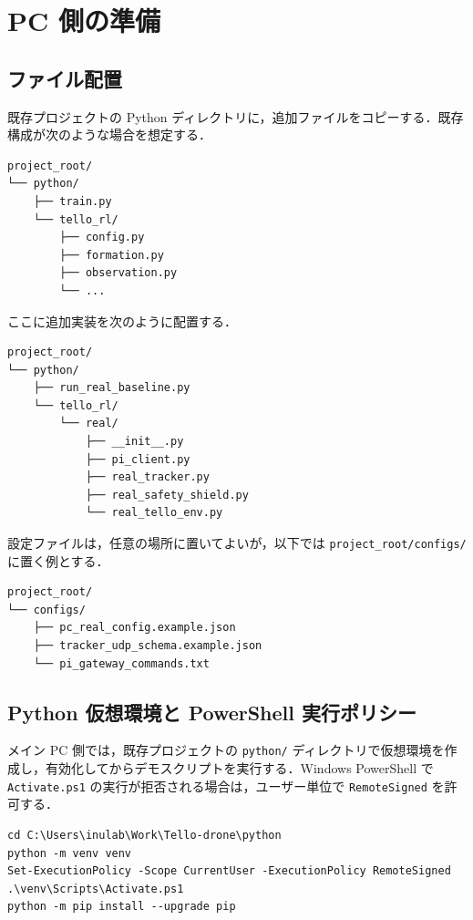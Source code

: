\section{PC 側の準備}
\label{sec:pc_setup}

\subsection{ファイル配置}

既存プロジェクトの Python ディレクトリに，追加ファイルをコピーする．既存構成が次のような場合を想定する．

\begin{lstlisting}
project_root/
└── python/
    ├── train.py
    └── tello_rl/
        ├── config.py
        ├── formation.py
        ├── observation.py
        └── ...
\end{lstlisting}

ここに追加実装を次のように配置する．

\begin{lstlisting}
project_root/
└── python/
    ├── run_real_baseline.py
    └── tello_rl/
        └── real/
            ├── __init__.py
            ├── pi_client.py
            ├── real_tracker.py
            ├── real_safety_shield.py
            └── real_tello_env.py
\end{lstlisting}

設定ファイルは，任意の場所に置いてよいが，以下では \texttt{project\_root/configs/} に置く例とする．

\begin{lstlisting}
project_root/
└── configs/
    ├── pc_real_config.example.json
    ├── tracker_udp_schema.example.json
    └── pi_gateway_commands.txt
\end{lstlisting}

\subsection{Python 仮想環境と PowerShell 実行ポリシー}

メイン PC 側では，既存プロジェクトの \texttt{python/} ディレクトリで仮想環境を作成し，有効化してからデモスクリプトを実行する．Windows PowerShell で \texttt{Activate.ps1} の実行が拒否される場合は，ユーザー単位で \texttt{RemoteSigned} を許可する．

\begin{lstlisting}
cd C:\Users\inulab\Work\Tello-drone\python
python -m venv venv
Set-ExecutionPolicy -Scope CurrentUser -ExecutionPolicy RemoteSigned
.\venv\Scripts\Activate.ps1
python -m pip install --upgrade pip
\end{lstlisting}

